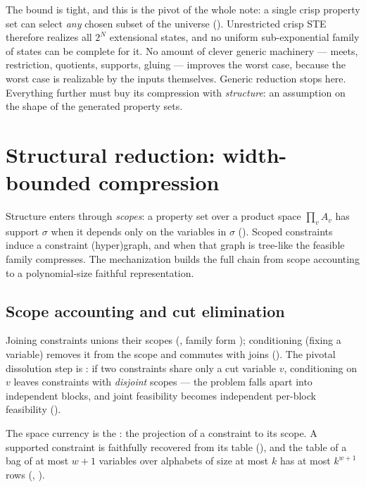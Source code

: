 \documentclass[11pt]{article}
\begin{document}
The bound is tight, and this is the pivot of the whole note: a single
crisp property set can select \emph{any} chosen subset of the universe
().  Unrestricted crisp STE
therefore realizes all $2^N$ extensional states, and no uniform
sub-exponential family of states can be complete for it.  No amount of
clever generic machinery --- meets, restriction, quotients, supports,
gluing --- improves the worst case, because the worst case is
realizable by the inputs themselves.  Generic reduction stops here.
Everything further must buy its compression with \emph{structure}: an
assumption on the shape of the generated property sets.

\section{Structural reduction: width-bounded compression}
\label{sec:structure}

Structure enters through \emph{scopes}: a property set over a product
space $\prod_v A_v$ has support $\sigma$ when it depends only on the
variables in $\sigma$ ().  Scoped constraints induce a
constraint (hyper)graph, and when that graph is tree-like the feasible
family compresses.  The mechanization builds the full chain from scope
accounting to a polynomial-size faithful representation.

\subsection{Scope accounting and cut elimination}

Joining constraints unions their scopes (,
family form ); conditioning (fixing a variable)
removes it from the scope and commutes with joins
().  The pivotal dissolution step is
: if two constraints share only a cut variable
$v$, conditioning on $v$ leaves constraints with \emph{disjoint} scopes
--- the problem falls apart into independent blocks, and joint
feasibility becomes independent per-block feasibility
().

The space currency is the : the projection of a constraint
to its scope.  A supported constraint is faithfully recovered from its
table (), and the table of a bag of
at most $w+1$ variables over alphabets of size at most $k$ has at most
$k^{w+1}$ rows (, ).
\end{document}
